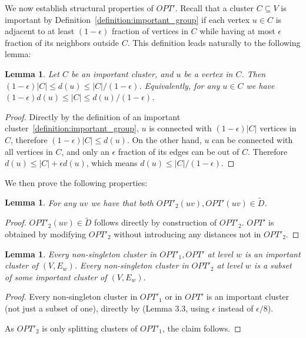\documentclass{article}
\newtheorem{lemma}[theorem]{Lemma}
\begin{document}
We now establish structural properties of $OPT'$. Recall that a cluster $C\subseteq V$ is important by Definition~\ref{definition:important_group} if each vertex $u\in C$ is adjacent to at least $(1-\epsilon)$ fraction of vertices in $C$ while having at most $\epsilon$ fraction of its neighbors outside $C$. This definition leads naturally to the following lemma:

\begin{lemma} \label{lem:importantDegrees}
Let $C$ be an important cluster, and $u$ be a vertex in $C$.
Then $(1-\epsilon)|C| \le d(u) \le |C|/(1-\epsilon)$.
Equivalently, for any $u\in C$ we have $(1-\epsilon)d(u) \le |C| \le d(u) / (1-\epsilon)$.
\end{lemma}
\begin{proof}
Directly by the definition of an important cluster~\ref{definition:important_group}, $u$ is connected with $(1-\epsilon)|C|$ vertices in $C$, therefore $(1-\epsilon)|C| \le d(u)$.
On the other hand, $u$ can be connected with all vertices in $C$, and only an $\epsilon$ fraction of its edges can be out of $C$.
Therefore $d(u) \le |C| + \epsilon d(u)$, which means $d(u) \le |C| / (1-\epsilon)$.
\end{proof}

We then prove the following properties:

\begin{lemma}
For any $uv$ we have that both $OPT'_2(uv), OPT'(uv) \in \widetilde{D}$.
\end{lemma}
\begin{proof}
$OPT'_2(uv) \in \widetilde{D}$ follows directly by construction of $OPT'_2$.
$OPT'$ is obtained by modifying $OPT'_2$ without introducing any distances not in $OPT'_2$.
\end{proof}

\begin{lemma} \label{lem:subsetImportant}
Every non-singleton cluster in $OPT'_1, OPT'$ at level $w$ is an important cluster of $(V,E_w)$.
Every non-singleton cluster in $OPT'_2$ at level $w$ is a subset of some important cluster of $(V,E_w)$.
\end{lemma}
\begin{proof}
Every non-singleton cluster in $OPT'_1$ or in $OPT'$ is an important cluster (not just a subset of one), directly by \cite{cohen2022fitting} (Lemma 3.3, using $\epsilon$ instead of $\epsilon/8$).

As $OPT'_2$ is only splitting clusters of $OPT'_1$, the claim follows.
\end{proof}
\end{document}
